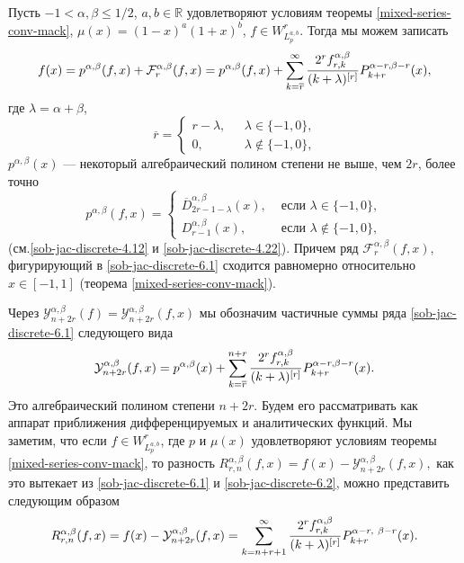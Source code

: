 Пусть $-1<\alpha, \beta\le1/2$, $a , b \in \mathbb{R} $ удовлетворяют
условиям теоремы \ref{mixed-series-conv-mack}, $\mu(x)=(1-x)^a(1+x)^b $, $f\in W^r_{L^{a,b}_p}$. Тогда мы можем записать
\begin{equation}\label{sob-jac-discrete-6.1}
f(x)=p^{\alpha, \beta}(f,x)+\mathcal{F}_r^{\alpha, \beta} (f,x) =
 p ^{\alpha, \beta} (f,x) +\sum _{k=\overline r} ^ \infty {2^r f_{r,k}^{\alpha, \beta}
\over (k+\lambda)^{[r]} } P_{k+r}^{\alpha -r, \beta -r} (x),
\end{equation}
где $\lambda = \alpha +\beta $,
$$\overline r = \begin{cases} r-\lambda,&\text{ $\lambda \in \{-1,0\}$,}\\
0,&\text{ $\lambda \notin \{-1,0\}$,}\end{cases} $$ $p^{\alpha,
\beta}(x)$
--- некоторый алгебраический полином степени не выше, чем $2r$,
более точно
$$p^{\alpha, \beta}(f, x) = \begin{cases} \overline D _{2r-1-\lambda}^{\alpha, \beta}(x),&
\text{ если $\lambda \in \{-1,0\}$}, \\D _{r-1}^{\alpha, \beta}(x),&
\text{ если  $\lambda \notin \{-1,0\}$,}\end{cases}$$
(см.\eqref{sob-jac-discrete-4.12} и \eqref{sob-jac-discrete-4.22}). Причем ряд $\mathcal{F}_r^{\alpha, \beta} (f,x) $,
фигурирующий в \eqref{sob-jac-discrete-6.1} сходится равномерно относительно $x\in [-1,1] $
(теорема \ref{mixed-series-conv-mack}).

Через $\mathcal{Y}_{n+2r}^{\alpha, \beta}(f)=\mathcal{Y}_{n+2r}^{\alpha,
\beta}(f,x) $ мы обозначим частичные суммы ряда \eqref{sob-jac-discrete-6.1} следующего
вида
\begin{equation}\label{sob-jac-discrete-6.2}
\mathcal{Y}_{n+2r}^{\alpha, \beta}(f,x)=p^{\alpha, \beta}(x)+
\sum _{k=\overline r}^ {n+r}{2^r f_{r,k}^{\alpha, \beta } \over (k+\lambda)^{[r]}}
 P^{\alpha-r,\beta-r}_{k+r}(x).
\end{equation}
Это алгебраический полином степени $n+2r$. Будем его рассматривать
как аппарат приближения дифференцируемых и аналитических функций. Мы
заметим, что если $f\in W_{L^{a,b}_p}^r $, где $p$ и $\mu(x)$
удовлетворяют условиям теоремы \ref{mixed-series-conv-mack}, то разность
$R_{r,n}^{\alpha,\beta}(f,x)=f(x)-\mathcal{Y}_{n+2r}^{\alpha,
\beta}(f,x),$ как это вытекает из \eqref{sob-jac-discrete-6.1} и \eqref{sob-jac-discrete-6.2}, можно представить
следующим образом
\begin{equation}\label{sob-jac-discrete-6.3}
R_{r,n}^{\alpha, \beta } (f,x) = f(x) - \mathcal{Y}_{n+2r}^{\alpha, \beta}(f,x)=
\sum _{k=n+r+1}^ \infty {2^r f_{r,k} ^{\alpha, \beta} \over
(k+\lambda)^{[r]}}P_{k+r}^{\alpha-r,\ \beta - r}(x).
\end{equation}

